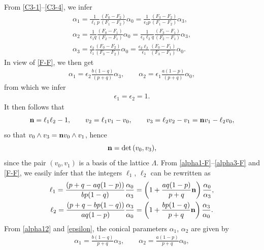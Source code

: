 \documentclass[pdftex]{sigma}
\numberwithin{equation}{section}
\begin{document}
From \eqref{C3-1}--\eqref{C3-4}, we infer
\begin{gather} \alpha _1 = \frac{1}{\ell _1 p} \frac{(F_0 - F_2)}{(F_1 - F_2)} \alpha _0 = \frac{1}{\epsilon _2 p} \frac{(F_3 - F_2)}{(F_1 - F_2)} \alpha _3, \label{alpha1-F}\\
\alpha _2 = \frac{1}{\epsilon _1 q} \frac{(F_0 - F_1)}{(F_2 - F_1)} \alpha _0 = \frac{1}{\epsilon _2 \ell _2 q} \frac{(F_3 - F_1)}{(F_2 - F_1)} \alpha _3, \label{alpha2-F} \\
\alpha _3 = \frac{\epsilon _2}{\ell _1} \frac{(F_0- F_2)}{(F_3 - F_2)} \alpha _0 = \frac{\epsilon _2 \ell _2}{\epsilon _1} \frac{(F_0- F_1)}{(F_3 - F_1)} \alpha _0. \label{alpha3-F}\end{gather}
In view of \eqref{F-F}, we then get
\begin{gather} \label{alpha12} \alpha _1 = \epsilon _2 \frac{b (1 - q)}{(p + q)} \alpha _3, \qquad \alpha _2 =
\epsilon _1 \frac{a (1 - p)}{(p + q)} \alpha _0, \end{gather}
from which we infer
\begin{gather} \label{epsilon} \epsilon _1 = \epsilon _2 = 1. \end{gather}
It then follows that
\begin{gather} {\bf n} = \ell _1 \ell _2 - 1,\qquad
v _2 = \ell _1 v _1 - v _0, \qquad v_3 = \ell _2 v_2 - v_1 = {\bf n} v_1 - \ell _2 v _0, \label{v2v3}\end{gather}
so that $v _0 \wedge v _3 = {\bf n} v _0 \wedge v _1$, hence
\[ {\bf n} = \det{(v_0, v _3)}, \]
 since the pair $(v_0, v_1)$ is a basis of the lattice $\Lambda$.
From \eqref{alpha1-F}--\eqref{alpha3-F} and \eqref{F-F}, we easily infer that the integers $\ell _1$, $\ell _2$ can be rewritten as
\begin{gather} \ell _1 = \frac{(p + q - a q (1 - p))}{b p (1 - q)} \frac{\alpha _0}{\alpha _3} = \left(1 + \frac{a q (1 - p)}{p + q} {\bf n}\right) \frac{\alpha _0}{\alpha _3},\label{ell1-def} \\
\ell _2 = \frac{(p + q - b p (1 - q))}{a q (1 - p)} \frac{\alpha _3}{\alpha _0} = \left(1 + \frac{b p (1 - q)}{p + q} {\bf n}\right) \frac{\alpha _3}{\alpha _0}.\label{ell2-def} \end{gather}
From \eqref{alpha12} and \eqref{epsilon}, the conical parameters $\alpha _1$, $\alpha _2$ are given by
\begin{gather} \label{alpha12-def} \alpha _1 = \frac{b (1 - q)}{p + q} \alpha _3, \qquad
 \alpha _2 = \frac{a (1 - p)}{p + q} \alpha _0, \end{gather}
\end{document}
